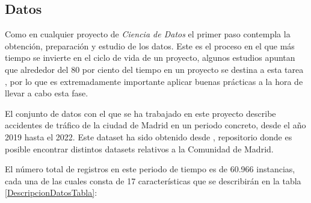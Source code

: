     \subsection{Datos}


            Como en cualquier proyecto de \textit{Ciencia de Datos} el primer paso contempla la obtención, preparación y estudio de los datos. Este es el proceso en el que más tiempo se invierte en el ciclo de vida de un proyecto, algunos estudios apuntan que alrededor del 80 por ciento del tiempo en un proyecto se destina a esta tarea \cite{LifecycleDataScienceProjectsTimes}, por lo que es extremadamente importante aplicar buenas prácticas a la hora de llevar a cabo esta fase.

            El conjunto de datos con el que se ha trabajado en este proyecto describe accidentes de tráfico de la ciudad de Madrid en un periodo concreto, desde el año 2019 hasta el 2022. Este dataset ha sido obtenido desde \cite{DatasetMadrid}, repositorio donde es posible encontrar distintos datasets relativos a la Comunidad de Madrid.

            El número total de registros en este periodo de tiempo es de 60.966 instancias, cada una de las cuales consta de 17 características que se describirán en la tabla \ref{DescripcionDatosTabla}:

